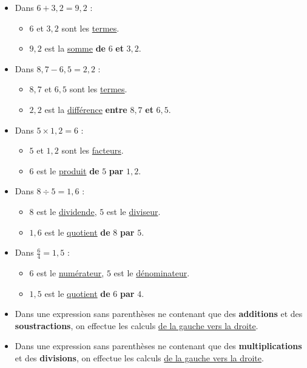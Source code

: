 \documentclass[../€Cours-complet/Cours-complet]{subfiles}
\begin{document}
\begin{exemple}
	\begin{itemize}
		\item Dans $6 + 3,2 = 9,2$ :
		      \begin{itemize}
			      \item $6$ et $3,2$ sont les \uline{termes}.
			      \item $9,2$ est la \uline{somme} \textbf{de} $6$ \textbf{et} $3,2$.
		      \end{itemize}
		\item Dans $8,7 - 6,5 = 2,2$ :
		      \begin{itemize}
			      \item $8,7$ et $6,5$ sont les \uline{termes}.
			      \item $2,2$ est la \uline{différence} \textbf{entre} $8,7$ \textbf{et} $6,5$.
		      \end{itemize}
		\item Dans $5 × 1,2 = 6$ :
		      \begin{itemize}
			      \item $5$ et $1,2$ sont les \uline{facteurs}.
			      \item $6$ est le \uline{produit} \textbf{de} $5$ \textbf{par} $1,2$.
		      \end{itemize}
		\item Dans $8 ÷ 5 = 1,6$ :
		      \begin{itemize}
			      \item $8$ est le \uline{dividende}, $5$ est le \uline{diviseur}.
			      \item $1,6$ est le \uline{quotient} \textbf{de} $8$ \textbf{par} $5$.
		      \end{itemize}
		\item Dans $\frac{6}{4} = 1,5$ :
		      \begin{itemize}
			      \item $6$ est le \uline{numérateur}, $5$ est le \uline{dénominateur}.
			      \item $1,5$ est le \uline{quotient} \textbf{de} $6$ \textbf{par} $4$.
		      \end{itemize}
	\end{itemize}
\end{exemple}

\begin{cours}
	\begin{itemize}
		\item Dans une expression sans parenthèses ne contenant que des \textbf{additions} et des \textbf{soustractions}, on effectue les calculs \uline{de la gauche vers la droite}.
		\item Dans une expression sans parenthèses ne contenant que des \textbf{multiplications} et des \textbf{divisions}, on effectue les calculs \uline{de la gauche vers la droite}.
	\end{itemize}
\end{cours}
\end{document}
